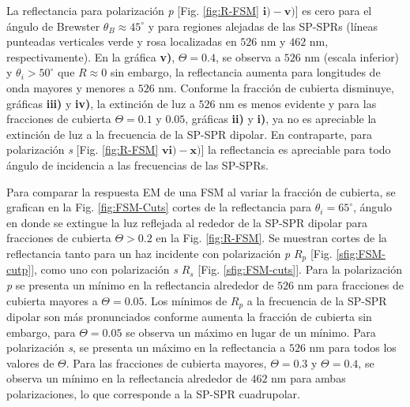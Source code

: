La reflectancia para polarización \emph{p} [Fig. \ref{fig:R-FSM} $\mathbf{i)-v)}$] es cero para el ángulo de Brewster $\theta_B \approx 45^\circ$ y para regiones alejadas de las SP-SPRs (líneas punteadas verticales verde y rosa  localizadas en $526$ nm y $462$ nm, respectivamente). En la gráfica \textbf{v)}, $\Theta=0.4$,  se observa a $526$ nm (escala inferior) y $\theta_i>50^\circ$ que $R\approx 0$ sin embargo, la reflectancia aumenta para longitudes de onda mayores y menores a $526$ nm. Conforme la fracción de cubierta disminuye, gráficas \textbf{iii)} y \textbf{iv)}, la extinción de luz a $526$ nm  es menos evidente y para las fracciones de cubierta $\Theta=0.1$ y $0.05$, gráficas \textbf{ii)} y \textbf{i)}, ya no es apreciable la extinción de luz a la frecuencia de la SP-SPR dipolar. En contraparte, para polarización \emph{s} [Fig. \ref{fig:R-FSM} $\mathbf{vi)-x)}$] la reflectancia es apreciable para todo ángulo de incidencia a las frecuencias de las SP-SPRs. 

Para comparar la respuesta EM  de una FSM al variar la fracción de cubierta, se grafican en la  Fig. \ref{fig:FSM-Cuts} cortes de la reflectancia para $\theta_i = 65^\circ$, ángulo en donde se extingue la luz reflejada al rededor de la SP-SPR dipolar para fracciones de cubierta $\Theta>0.2$ en la Fig. \ref{fig:R-FSM}. Se muestran cortes de la reflectancia tanto para un haz incidente con polarización \emph{p} $R_p$ [Fig. \ref{sfig:FSM-cutp}], como uno con polarización \emph{s} $R_s$ [Fig. \ref{sfig:FSM-cuts}]. Para la polarización \emph{p} se presenta un mínimo en la reflectancia alrededor de $526$ nm para fracciones de cubierta mayores a $\Theta = 0.05$. Los mínimos de $R_p$ a la frecuencia de la SP-SPR dipolar son más pronunciados conforme aumenta la fracción de cubierta sin embargo, para $\Theta=0.05$ se observa un máximo en lugar de un mínimo. Para polarización \emph{s}, se presenta un máximo en la reflectancia a $526$ nm para todos los valores de $\Theta$. Para las fracciones de cubierta mayores, $\Theta = 0.3$ y $\Theta = 0.4$,  se observa un  mínimo en la reflectancia alrededor de $462$ nm para ambas polarizaciones, lo que corresponde a la SP-SPR cuadrupolar.

